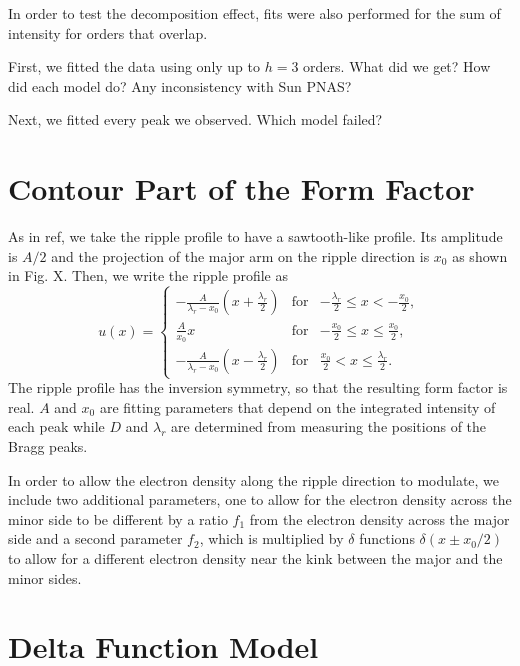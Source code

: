 \documentclass[12pt,letterpaper]{article}
\begin{document}
In order to test the decomposition effect, fits were also performed
for the sum of intensity for orders that overlap. 

First, we fitted the data using only up to $h=3$ orders. What did we get?
How did each model do? Any inconsistency with Sun PNAS?

Next, we fitted every peak we observed. Which model failed?


\section{Contour Part of the Form Factor}
As in ref, we take the ripple profile to have a sawtooth-like profile. Its
amplitude is  $A/2$ and the projection of the major arm on the 
ripple direction is $x_0$ as shown in Fig. X. Then, we write the ripple 
profile as
\begin{equation}
  u(x) = \left\{
    \begin{array}{ccc}
    -\frac{A}{\lambda_r-x_0}\left(x+\frac{\lambda_r}{2}\right) 
      & \text{for} 
      & -\frac{\lambda_r}{2} \leq x < -\frac{x_0}{2}, \\
    \frac{A}{x_0}x 
      & \text{for} 
      & -\frac{x_0}{2} \leq x \leq \frac{x_0}{2}, \\
    -\frac{A}{\lambda_r-x_0} \left(x-\frac{\lambda_r}{2}\right)
      & \text{for} 
      & \frac{x_0}{2} < x \leq \frac{\lambda_r}{2}.
    \end{array} \right.
\end{equation}
The ripple profile has the inversion symmetry, so that the resulting
form factor is real. $A$ and $x_0$ are fitting parameters that depend 
on the integrated intensity of each peak while $D$ and $\lambda_r$ are
determined from measuring the positions of the Bragg peaks.

In order to allow the electron density along the ripple direction to 
modulate, we include two additional parameters, one to allow for the electron
density across the minor side to be different by a ratio $f_1$ from the 
electron density across the major side and a second parameter $f_2$, which
is multiplied by $\delta$ functions $\delta(x \pm x_0/2)$ to allow for 
a different electron density near the kink between the major and the minor
sides. 


\section{Delta Function Model}
\end{document}

